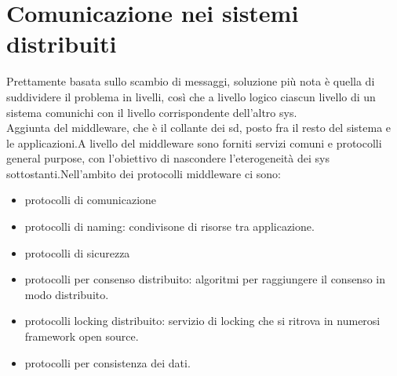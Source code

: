 \documentclass[16px]{article}
\begin{document}
\section{Comunicazione nei sistemi distribuiti}
Prettamente basata sullo scambio di messaggi, soluzione più nota è quella di suddividere il problema in livelli, così che a livello logico ciascun livello di un sistema comunichi con il livello corrispondente dell'altro sys.\\
Aggiunta del middleware, che è il collante dei sd, posto fra il resto del sistema e le applicazioni.A livello del middleware sono forniti servizi comuni e protocolli general purpose, con l'obiettivo di nascondere l'eterogeneità dei sys sottostanti.Nell'ambito dei protocolli middleware ci sono:
\begin{itemize}
\item protocolli di comunicazione
\item protocolli di naming: condivisone di risorse tra applicazione.
\item protocolli di sicurezza
\item protocolli per consenso distribuito: algoritmi per raggiungere il consenso in modo distribuito.
\item protocolli locking distribuito: servizio di locking che si ritrova in numerosi framework open source.
\item protocolli per consistenza dei dati.
\end{itemize}
\end{document}
